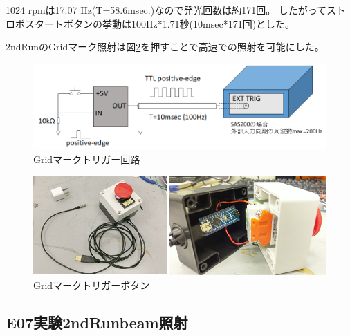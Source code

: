 \documentclass[12pt,a4paper]{jarticle}
\begin{document}
1024 rpmは17.07 Hz(T=58.6msec.)なので発光回数は約171回。
したがってストロボスタートボタンの挙動は100Hz*1.71秒(10msec*171回)とした。
\par
2ndRunのGridマーク照射は図\ref{fig:grid_botan}を押すことで高速での照射を可能にした。
\begin{figure}[htbp]
  \centering
     \includegraphics[width=140mm]{grid_kairo.png}
  \caption{Gridマークトリガー回路\label{fig:grid_kairo}}
\end{figure}
\begin{figure}[htbp]
  \centering
     \includegraphics[width=140mm]{grid_botan.png}
  \caption{Gridマークトリガーボタン\label{fig:grid_botan}}
\end{figure}
\subsection{E07実験2ndRunbeam照射}
\end{document}
